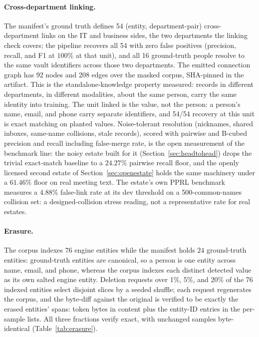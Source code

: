 \documentclass{article}
\begin{document}
\paragraph{Cross-department linking.}
The manifest's ground truth defines 54 (entity, department-pair) cross-department links on the IT and business sides, the two departments the linking check covers; the pipeline recovers all 54 with zero false positives (precision, recall, and F1 at $100\%$ at that unit), and all 16 ground-truth people resolve to the same vault identifiers across those two departments. The emitted connection graph has 92 nodes and 208 edges over the masked corpus, SHA-pinned in the artifact. This is the standalone-knowledge property measured: records in different departments, in different modalities, about the same person, carry the same identity into training. The unit linked is the value, not the person: a person's name, email, and phone carry separate identifiers, and 54/54 recovery at this unit is exact matching on planted values. Noise-tolerant resolution (nicknames, shared inboxes, same-name collisions, stale records), scored with pairwise and B-cubed~\cite{bagga1998bcubed} precision and recall including false-merge rate, is the open measurement of the benchmark line: the noisy estate built for it (Section~\ref{sec:headtohead}) drops the trivial exact-match baseline to a $24.27\%$ pairwise recall floor, and the openly licensed second estate of Section~\ref{sec:openestate} holds the same machinery under a $61.46\%$ floor on real meeting text. The estate's own PPRL benchmark~\cite{christen2012datamatching} measures a $4.88\%$ false-link rate at its dev threshold on a 500-common-names collision set: a designed-collision stress reading, not a representative rate for real estates.

\paragraph{Erasure.}
The corpus indexes $76$ engine entities while the manifest holds $24$ ground-truth entities: ground-truth entities are canonical, so a person is one entity across name, email, and phone, whereas the corpus indexes each distinct detected value as its own salted engine entity. Deletion requests over 1\%, 5\%, and 20\% of the 76 indexed entities select disjoint slices by a seeded shuffle; each request regenerates the corpus, and the byte-diff against the original is verified to be exactly the erased entities' spans: token bytes in content plus the entity-ID entries in the per-sample lists. All three fractions verify exact, with unchanged samples byte-identical (Table~\ref{tab:erasure}).
\end{document}
